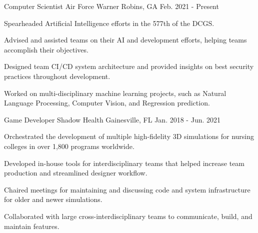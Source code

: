 \documentclass[11pt, a4paper]{awesome-cv}
\begin{document}
\begin{cventries}

  \cventry
    {Computer Scientist} %
    {Air Force} %
    {Warner Robins, GA} %
    {Feb. 2021 - Present} %
    {
      \begin{cvitems} %
        \item {Spearheaded Artificial Intelligence efforts in the 577th of the DCGS.}
        \item {Advised and assisted teams on their AI and development efforts, helping teams accomplish their objectives.}
        \item {Designed team CI/CD system architecture and provided insights on best security practices throughout development.}
        \item {Worked on multi-disciplinary machine learning projects, such as Natural Language Processing, Computer Vision, and Regression prediction.}
      \end{cvitems}
    }

  \cventry
    {Game Developer} %
    {Shadow Health} %
    {Gainesville, FL} %
    {Jan. 2018 - Jun. 2021} %
    {
      \begin{cvitems} %
        \item {Orchestrated the development of multiple high-fidelity 3D simulations for nursing colleges in over 1,800 programs worldwide.}
        \item {Developed in-house tools for interdisciplinary teams that helped increase team production and streamlined designer workflow.}
        \item {Chaired meetings for maintaining and discussing code and system infrastructure for older and newer simulations.}
        \item {Collaborated with large cross-interdisciplinary teams to communicate, build, and maintain features.}
      \end{cvitems}
    }

\end{cventries}
\end{document}
